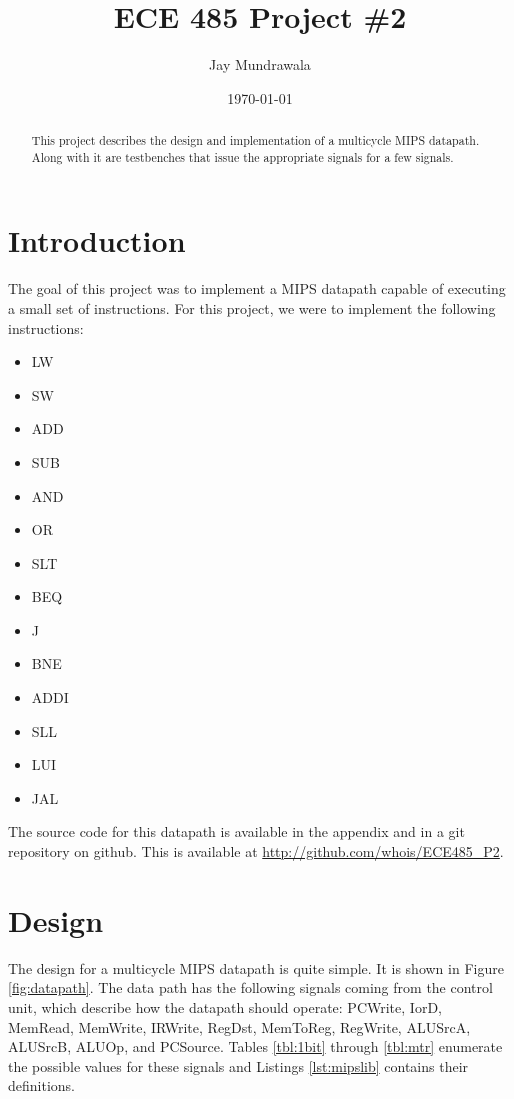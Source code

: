 \documentclass[12pt, a4paper]{article}
\begin{document}
\title{ECE 485 Project \#2}
\author{Jay Mundrawala}
\date{\today}
\maketitle

\begin{abstract}
  This project describes the design and implementation of a multicycle MIPS datapath. Along with it are
  testbenches that issue the appropriate signals for a few signals.
\end{abstract}

\section{Introduction}
The goal of this project was to implement a MIPS datapath capable of executing a small set of instructions.
For this project, we were to implement the following instructions:
\begin{itemize}
  \item LW
  \item SW
  \item ADD
  \item SUB
  \item AND
  \item OR
  \item SLT
  \item BEQ
  \item J
  \item BNE
  \item ADDI
  \item SLL
  \item LUI
  \item JAL
\end{itemize}
The source code for this datapath is available in the appendix and in a git repository on github.
This is available at \url{http://github.com/whois/ECE485_P2}.
\section{Design}
The design for a multicycle MIPS datapath is quite simple. It is shown in Figure \ref{fig:datapath}.
The data path has the following signals
coming from the control unit, which describe how the datapath should operate: PCWrite, IorD, MemRead,
MemWrite, IRWrite, RegDst, MemToReg, RegWrite, ALUSrcA, ALUSrcB, ALUOp, and PCSource. Tables \ref{tbl:1bit} through
\ref{tbl:mtr} enumerate the possible values for these signals and Listings \ref{lst:mipslib} contains their
definitions.
\end{document}
